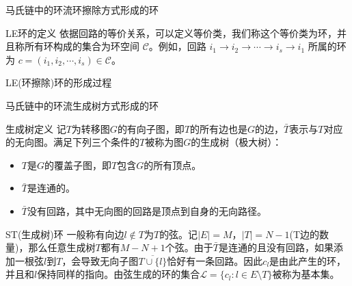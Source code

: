\documentclass{beamer}
\begin{document}
\begin{frame}{马氏链中的环流}{环擦除方式形成的环}
	\begin{block}{LE环的定义}
		依据回路的等价关系，可以定义等价类，我们称这个等价类为环，并且称所有环构成的集合为环空间 $\mathcal{C}$。例如，回路 $i_1 \to i_2 \to\cdots\to i_s \to i_1$ 所属的环为 $c = (i_1,i_2,\cdots,i_s) \in \mathcal{C}$。
	\end{block}

	\begin{block}{LE(环擦除)环的形成过程}
		\begin{table}[htb!]
			\renewcommand \arraystretch{1} \centering
			\caption{导出链的变化过程和轨道中形成的环}\label{trajectory}
		\end{table}
	\end{block}
\end{frame}


\begin{frame}{马氏链中的环流}{生成树方式形成的环}
	\begin{block}{生成树定义}
		记$T$为转移图$G$的有向子图，即$T$的所有边也是$G$的边，$\bar{T}$表示与$T$对应的无向图。满足下列三个条件的$T$被称为图$G$的生成树（极大树）：
		\begin{itemize}
			\item $T$是$G$的覆盖子图，即$T$包含$G$的所有顶点。
			\item $\bar{T}$是连通的。
			\item $\bar{T}$没有回路，其中无向图的回路是顶点到自身的无向路径。
		\end{itemize}
	\end{block}
	\begin{block}{ST(生成树)环}
		一般称有向边$l \notin T$为$T$的弦。记$|E|=M$，$|T|= N-1$(T边的数量)，那么任意生成树$T$都有$M-N+1$个弦。由于$\bar{T}$是连通的且没有回路，如果添加一根弦$l$到$T$，会导致无向子图$\overline{T \cup \{l\}}$恰好有一条回路。因此$c_l$是由此产生的环，并且和$l$保持同样的指向。由弦生成的环的集合$\mathcal{L} = \{c_l: l\in E\setminus T\}$被称为基本集。
	\end{block}
\end{frame}
\end{document}
